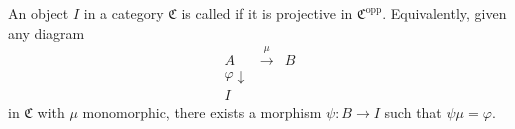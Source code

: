 An object $I$ in a category $\mathfrak{C}$ is called  if it is projective in $\mathfrak{C}^{\text{opp}}$. Equivalently, given any diagram
$$\begin{array}{ccc}
A & \xrightarrow{\mu} & B \\
{\scriptstyle\varphi}\downarrow & & \\
I & &
\end{array}$$
in $\mathfrak{C}$ with $\mu$ monomorphic, there exists a morphism $\psi: B \to I$ such that $\psi \mu = \varphi$.
